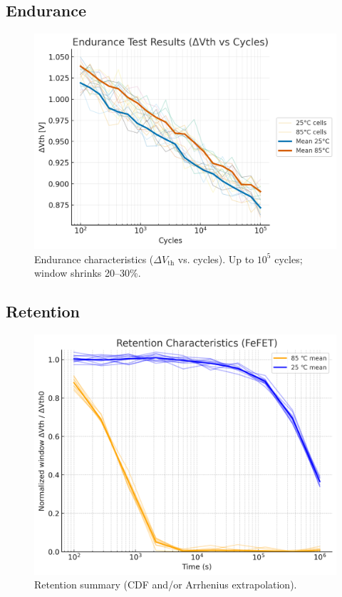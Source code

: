 \documentclass[conference]{IEEEtran}
\newcommand{\figw}{0.90\linewidth}
\begin{document}
\subsection{Endurance}
\begin{figure}[!t]
  \centering
  \includegraphics[width=\figw]{figures/fig5_endurance.png}
  \caption{Endurance characteristics ($\Delta V_{\mathrm{th}}$ vs. cycles). Up to $10^5$ cycles; window shrinks 20--30\%.}
  \label{fig:endurance}
\end{figure}

\subsection{Retention}
\begin{figure}[!t]
  \centering
  \includegraphics[width=\figw]{figures/fig6_retention.png}
  \caption{Retention summary (CDF and/or Arrhenius extrapolation).}
  \label{fig:retention}
\end{figure}
\end{document}
